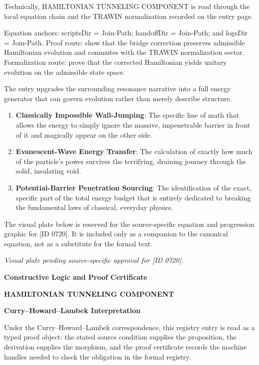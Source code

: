 Technically, HAMILTONIAN TUNNELING COMPONENT is read through the local equation chain and the TRAWIN normalization recorded on the entry page.

Equation anchors: scriptsDir = Join-Path; handoffDir = Join-Path; and logsDir = Join-Path. Proof route: show that the bridge correction preserves admissible Hamiltonian evolution and commutes with the TRAWIN normalization sector. Formalization route: prove that the corrected Hamiltonian yields unitary evolution on the admissible state space.

The entry upgrades the surrounding resonance narrative into a full energy generator that can govern evolution rather than merely describe structure.
\endgroup

\begin{enumerate}[leftmargin=1.6em,itemsep=6pt,topsep=4pt]
\item \textbf{Classically Impossible Wall-Jumping}: The specific line of math that allows the energy to simply ignore the massive, impenetrable barrier in front of it and magically appear on the other side.
\item \textbf{Evanescent-Wave Energy Transfer}: The calculation of exactly how much of the particle's power survives the terrifying, draining journey through the solid, insulating void.
\item \textbf{Potential-Barrier Penetration Sourcing}: The identification of the exact, specific part of the total energy budget that is entirely dedicated to breaking the fundamental laws of classical, everyday physics.
\end{enumerate}

\begingroup\footnotesize\sloppy
The visual plate below is reserved for the source-specific equation and progression graphic for [ID 0720]. It is included only as a companion to the canonical equation, not as a substitute for the formal text.
\par\endgroup
\begingroup\footnotesize\itshape
Visual plate pending source-specific approval for [ID 0720].
\par\endgroup

\clearpage
\begingroup\tzpsupportsetup
\noindent\textbf{\fontsize{10.8pt}{12.8pt}\selectfont [ID 0720] Constructive Logic and Proof Certificate}\par
\noindent\textbf{\fontsize{10pt}{12pt}\selectfont HAMILTONIAN TUNNELING COMPONENT}\par
\vspace{0.45em}
\begingroup
\footnotesize
\setlength{\parskip}{0.22em}
\setlength{\parindent}{0pt}
\noindent\textbf{Curry--Howard--Lambek Interpretation}\par
Under the Curry--Howard--Lambek correspondence, this registry entry is read as a typed proof
object: the stated source condition supplies the proposition, the derivation supplies the
morphism, and the proof certificate records the machine handles needed to check the obligation
in the formal registry.

